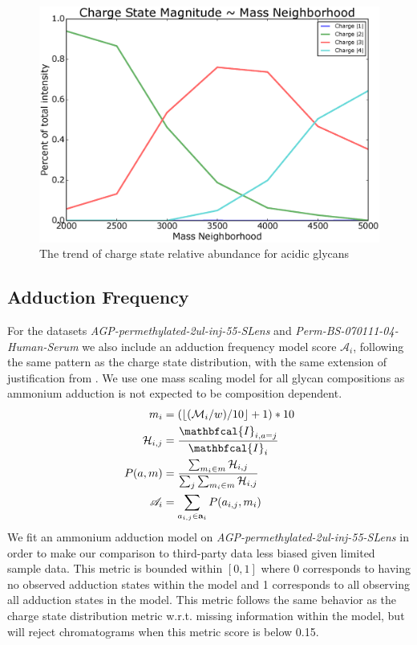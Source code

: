         \begin{figure}
            \centering
            \includegraphics[width=0.75\linewidth]{figure/charge_trend_plot.eps}
            \caption{The trend of charge state relative abundance for acidic glycans}
            \label{fig:charge_trend_plot}
        \end{figure}

    \subsection{Adduction Frequency}
        For the datasets \textit{AGP-permethylated-2ul-inj-55-SLens} and \textit{Perm-BS-070111-04-Human-Serum}
        we also include an adduction frequency model score $\mathscr{A}_i$, following the same
        pattern as the charge state distribution, with the same extension of justification
        from \cite{Maxwell2012}. We use one mass scaling model for all glycan compositions
        as ammonium adduction is not expected to be composition dependent.
        \begin{align}
            m_i &= (\floor*{(\mathcal{M}_i / w) / 10} + 1) * 10 \nonumber\\
            \mathcal{H}_{i,j} &= \frac{
                \mathbfcal{I}_{i, a=j}}{\mathbfcal{I}_i} \nonumber\\
            P(a, m) &= \frac{\sum_{m_i \in m} \mathcal{H}_{i, j}}{\sum_j{
                \sum_{m_i \in m} \mathcal{H}_{i, j}}} \nonumber\\
            \mathscr{A}_i &= \sum_{a_{i, j} \in \mathbf{a}_i}{P(a_{i, j}, m_i)}
        \end{align}
        We fit an ammonium adduction model on \textit{AGP-permethylated-2ul-inj-55-SLens}
        in order to make our comparison to third-party data less biased given limited sample data.
        This metric is bounded within $[0, 1]$ where 0 corresponds to having no observed adduction
        states within the model and 1 corresponds to all observing all adduction states in the model.
        This metric follows the same behavior as the charge state distribution metric w.r.t. missing
        information within the model, but will reject chromatograms when this metric score is below 0.15.

